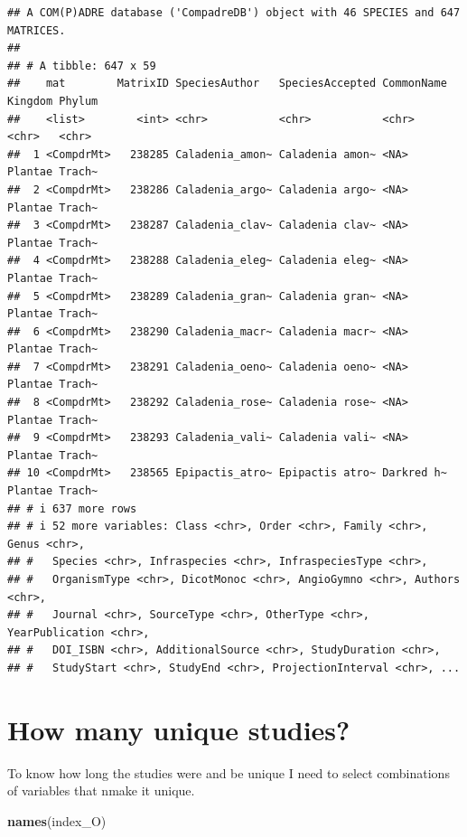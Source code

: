\documentclass[
]{book}
\newenvironment{Shaded}{\begin{snugshade}}{\end{snugshade}}
\newcommand{\FunctionTok}[1]{\textcolor[rgb]{0.13,0.29,0.53}{\textbf{#1}}}
\newcommand{\NormalTok}[1]{#1}
\theoremstyle{definition}
\theoremstyle{definition}
\theoremstyle{definition}
\theoremstyle{definition}
\theoremstyle{remark}
\begin{document}
\begin{verbatim}
## A COM(P)ADRE database ('CompadreDB') object with 46 SPECIES and 647 MATRICES.
## 
## # A tibble: 647 x 59
##    mat        MatrixID SpeciesAuthor   SpeciesAccepted CommonName Kingdom Phylum
##    <list>        <int> <chr>           <chr>           <chr>      <chr>   <chr> 
##  1 <CompdrMt>   238285 Caladenia_amon~ Caladenia amon~ <NA>       Plantae Trach~
##  2 <CompdrMt>   238286 Caladenia_argo~ Caladenia argo~ <NA>       Plantae Trach~
##  3 <CompdrMt>   238287 Caladenia_clav~ Caladenia clav~ <NA>       Plantae Trach~
##  4 <CompdrMt>   238288 Caladenia_eleg~ Caladenia eleg~ <NA>       Plantae Trach~
##  5 <CompdrMt>   238289 Caladenia_gran~ Caladenia gran~ <NA>       Plantae Trach~
##  6 <CompdrMt>   238290 Caladenia_macr~ Caladenia macr~ <NA>       Plantae Trach~
##  7 <CompdrMt>   238291 Caladenia_oeno~ Caladenia oeno~ <NA>       Plantae Trach~
##  8 <CompdrMt>   238292 Caladenia_rose~ Caladenia rose~ <NA>       Plantae Trach~
##  9 <CompdrMt>   238293 Caladenia_vali~ Caladenia vali~ <NA>       Plantae Trach~
## 10 <CompdrMt>   238565 Epipactis_atro~ Epipactis atro~ Darkred h~ Plantae Trach~
## # i 637 more rows
## # i 52 more variables: Class <chr>, Order <chr>, Family <chr>, Genus <chr>,
## #   Species <chr>, Infraspecies <chr>, InfraspeciesType <chr>,
## #   OrganismType <chr>, DicotMonoc <chr>, AngioGymno <chr>, Authors <chr>,
## #   Journal <chr>, SourceType <chr>, OtherType <chr>, YearPublication <chr>,
## #   DOI_ISBN <chr>, AdditionalSource <chr>, StudyDuration <chr>,
## #   StudyStart <chr>, StudyEnd <chr>, ProjectionInterval <chr>, ...
\end{verbatim}

\hypertarget{how-many-unique-studies}{%
\section{How many unique studies?}\label{how-many-unique-studies}}

To know how long the studies were and be unique I need to select combinations of variables that nmake it unique.

\begin{Shaded}
\begin{Highlighting}[]
\FunctionTok{names}\NormalTok{(index\_O)}
\end{Highlighting}
\end{Shaded}
\end{document}
